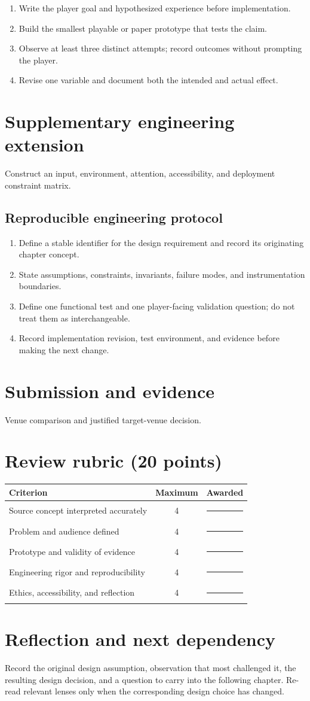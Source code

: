 \documentclass[11pt]{article}
\begin{document}
\begin{enumerate}
\item Write the player goal and hypothesized experience before implementation.
\item Build the smallest playable or paper prototype that tests the claim.
\item Observe at least three distinct attempts; record outcomes without prompting the player.
\item Revise one variable and document both the intended and actual effect.
\end{enumerate}

\section{Supplementary engineering extension}
Construct an input, environment, attention, accessibility, and deployment constraint matrix.


\subsection{Reproducible engineering protocol}
\begin{enumerate}
\item Define a stable identifier for the design requirement and record its originating chapter concept.
\item State assumptions, constraints, invariants, failure modes, and instrumentation boundaries.
\item Define one functional test and one player-facing validation question; do not treat them as interchangeable.
\item Record implementation revision, test environment, and evidence before making the next change.
\end{enumerate}

\section{Submission and evidence}
Venue comparison and justified target-venue decision.


\section{Review rubric (20 points)}
\begin{tabularx}{\linewidth}{@{}Xcc@{}}\toprule
Criterion & Maximum & Awarded \\ \midrule
Source concept interpreted accurately & 4 & \rule{0.45in}{0.4pt}\\
Problem and audience defined & 4 & \rule{0.45in}{0.4pt}\\
Prototype and validity of evidence & 4 & \rule{0.45in}{0.4pt}\\
Engineering rigor and reproducibility & 4 & \rule{0.45in}{0.4pt}\\
Ethics, accessibility, and reflection & 4 & \rule{0.45in}{0.4pt}\\\bottomrule
\end{tabularx}

\section{Reflection and next dependency}
Record the original design assumption, observation that most challenged it, the resulting design decision, and a question to carry into the following chapter. Re-read relevant lenses only when the corresponding design choice has changed.
\end{document}

